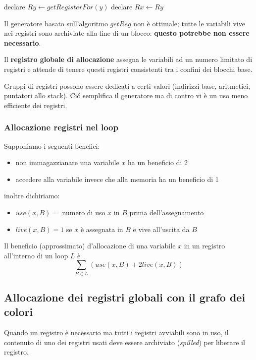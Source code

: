 \begin{algorithm}[H]
\caption{$getReg(x:=y)$}
\label{alg:getRegEq}
\begin{algorithmic}
\State declare $Ry \leftarrow getRegisterFor(y)$
\State declare $Rx \leftarrow Ry$
\end{algorithmic}
\end{algorithm}

Il generatore basato sull'algoritmo $getReg$ non \`e ottimale; tutte le
variabili vive nei registri sono archiviate alla fine di un blocco:
\textbf{questo potrebbe non essere necessario}.

Il \textbf{registro globale di allocazione} assegna le variabili ad un numero
limitato di registri e attende di tenere questi registri consistenti tra i
confini dei blocchi base.

Gruppi di registri possono essere dedicati a certi valori (indirizzi base,
aritmetici, puntatori allo stack). Ci\'o semplifica il generatore ma di contro
vi \`e un uso meno efficiente dei registri.

\subsubsection{Allocazione registri nel loop}
Supponiamo i seguenti benefici:
\begin{itemize}
\item non immagazzianare una variabile $x$ ha un beneficio di 2
\item accedere alla variabile invece che alla memoria ha un beneficio di 1
\end{itemize}

inoltre dichiriamo:
\begin{itemize}
\item $use(x,B)=$ numero di uso $x$ in $B$ prima dell'assegnamento
\item $live(x,B)=1$ se $x$ \`e assegnata in $B$ e vive all'uscita da $B$
\end{itemize}

\begin{definition}[Benefit]
Il beneficio (approssimato) d'allocazione di una variabile $x$ in un registro
all'interno di un loop $L$ \`e
$$\sum_{B \in L}(use(x,B)+2live(x,B))$$
\end{definition}

\subsection{Allocazione dei registri globali con il grafo dei colori}
Quando un registro \`e necessario ma tutti i registri avviabili sono in uso,
il contenuto di uno dei registri usati deve essere archiviato
(\textit{spilled}) per liberare il registro.

